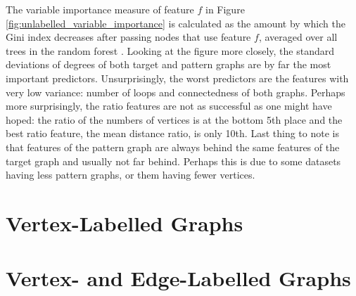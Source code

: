 \documentclass{l4proj}
\theoremstyle{definition}
\theoremstyle{remark}
\begin{document}
The variable importance measure of feature $f$ in Figure
\ref{fig:unlabelled_variable_importance} is calculated as the amount by which
the Gini index decreases after passing nodes that use feature $f$, averaged over
all trees in the random forest \cite{James:2014:ISL:2517747}. Looking at the
figure more closely, the standard deviations of degrees of both target and
pattern graphs are by far the most important predictors. Unsurprisingly, the
worst predictors are the features with very low variance: number of loops and
connectedness of both graphs. Perhaps more surprisingly, the ratio features are
not as successful as one might have hoped: the ratio of the numbers of vertices
is at the bottom 5th place and the best ratio feature, the mean distance ratio,
is only 10th. Last thing to note is that features of the pattern graph are
always behind the same features of the target graph and usually not far behind.
Perhaps this is due to some datasets having less pattern graphs, or them having
fewer vertices.

\section{Vertex-Labelled Graphs}

\section{Vertex- and Edge-Labelled Graphs}




\end{document}

